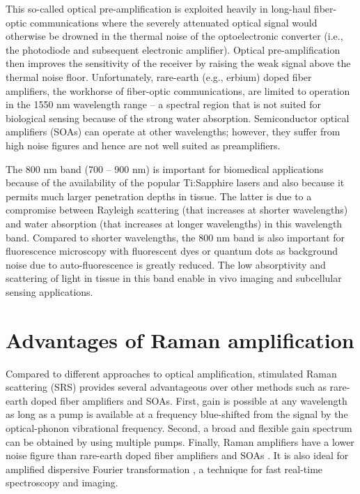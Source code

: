 This so-called optical pre-amplification is exploited heavily in long-haul fiber-optic communications \cite{islam2002raman} where the severely attenuated optical signal would otherwise be drowned in the thermal noise of the optoelectronic converter (i.e., the photodiode and subsequent electronic amplifier). Optical pre-amplification then improves the sensitivity of the receiver by raising the weak signal above the thermal noise floor. Unfortunately, rare-earth (e.g., erbium) doped fiber amplifiers, the workhorse of fiber-optic communications, are limited to operation in the 1550 nm wavelength range – a spectral region that is not suited for biological sensing because of the strong water absorption. Semiconductor optical amplifiers (SOAs) can operate at other wavelengths; however, they suffer from high noise figures and hence are not well suited as preamplifiers. 

The 800 nm band (700 – 900 nm) is important for biomedical applications because of the availability of the popular Ti:Sapphire lasers and also because it permits much larger penetration depths in tissue. The latter is due to a compromise between Rayleigh scattering (that increases at shorter wavelengths) and water absorption (that increases at longer wavelengths) in this wavelength band. Compared to shorter wavelengths, the 800 nm band is also important for fluorescence microscopy with fluorescent dyes or quantum dots as background noise due to auto-fluorescence is greatly reduced. The low absorptivity and scattering of light in tissue in this band enable in vivo imaging and subcellular sensing applications.

\section{Advantages of Raman amplification}

Compared to different approaches to optical amplification, stimulated Raman scattering (SRS) \cite{islam2002raman} provides several advantageous over other methods such as rare-earth doped fiber amplifiers and SOAs. First, gain is possible at any wavelength as long as a pump is available at a frequency blue-shifted from the signal by the optical-phonon vibrational frequency. Second, a broad and flexible gain spectrum can be obtained by using multiple pumps. Finally, Raman amplifiers have a lower noise figure than rare-earth doped fiber amplifiers and SOAs \cite{islam2002raman}. It is also ideal for amplified dispersive Fourier transformation \cite{goda2009serial,goda2008amplified,goda2009theory}, a technique for fast real-time spectroscopy and imaging. 

